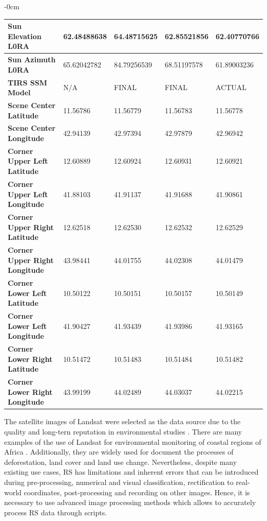 \documentclass[jimaging,article,submit,pdftex,moreauthors]{Definitions/mdpi}
\begin{document}
\begin{table}[!ht]
\begin{adjustwidth}{-\extralength}{0cm}
\begin{tabular}{|l|l|l|l|l|}
        \textbf{Sun Elevation L0RA} & 62.48488638 & 64.48715625 & 62.85521856 & 62.40770766 \\ \hline
        \textbf{Sun Azimuth L0RA} & 65.62042782 & 84.79256539 & 68.51197578 & 61.89003236 \\ \hline
        \textbf{TIRS SSM Model} & N/A & FINAL & FINAL & ACTUAL \\ \hline
        \textbf{Scene Center Latitude} & 11.56786 & 11.56779 & 11.56783 & 11.56778 \\ \hline
        \textbf{Scene Center Longitude} & 42.94139 & 42.97394 & 42.97879 & 42.96942 \\ \hline
        \textbf{Corner Upper Left Latitude} & 12.60889 & 12.60924 & 12.60931 & 12.60921 \\ \hline
        \textbf{Corner Upper Left Longitude} & 41.88103 & 41.91137 & 41.91688 & 41.90861 \\ \hline
        \textbf{Corner Upper Right Latitude} & 12.62518 & 12.62530 & 12.62532 & 12.62529 \\ \hline
        \textbf{Corner Upper Right Longitude} & 43.98441 & 44.01755 & 44.02308 & 44.01479 \\ \hline
        \textbf{Corner Lower Left Latitude} & 10.50122 & 10.50151 & 10.50157 & 10.50149 \\ \hline
        \textbf{Corner Lower Left Longitude} & 41.90427 & 41.93439 & 41.93986 & 41.93165 \\ \hline
        \textbf{Corner Lower Right Latitude} & 10.51472 & 10.51483 & 10.51484 & 10.51482 \\ \hline
        \textbf{Corner Lower Right Longitude} & 43.99199 & 44.02489 & 44.03037 & 44.02215 \\ \hline
    \end{tabular}
    \end{adjustwidth}
\end{table}

The satellite images of Landsat were selected as the data source due to the quality and long-tern reputation in environmental studies \cite{GONG2024149,ALLU2025127478,CHANUWANWIJESINGHE2024112681}. There are many examples of the use of Landsat for environmental monitoring of coastal regions of Africa \cite{BHAGA2023101037,Lemenkova202401,FEYISA201423}. Additionally, they are widely used for document the processes of deforestation, land cover and land use change. Nevertheless, despite many existing use cases, RS has limitations and inherent errors that can be introduced during pre-processing, numerical and visual classification, rectification to real-world coordinates, post-processing and recording on other images. Hence, it is necessary to use advanced image processing methods which allows to accurately process RS data through scripts.
\end{document}
